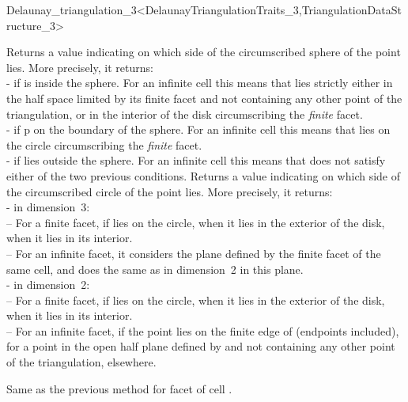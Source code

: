 \begin{ccRefClass}{Delaunay_triangulation_3<DelaunayTriangulationTraits_3,TriangulationDataStructure_3>}

{Returns a value indicating on which side of the circumscribed sphere
of  the point  lies. More precisely, it returns:\\
-  if  is inside the sphere. For an infinite
cell this means that  lies strictly either in the half space
limited by its finite facet and not containing any other point of the
triangulation, or in the interior of the disk circumscribing the
\textit{finite} facet. \\ 
-  if p on the boundary of the sphere. For an infinite
cell this means that  lies on the circle circumscribing
the \textit{finite} facet.\\ 
-  if  lies outside the sphere. For an
infinite cell this means that  does not satisfy either of the
two previous conditions. 
}
{Returns a value indicating on which side of the circumscribed circle
of  the point  lies. More precisely, it returns:\\
- in dimension~3:\\
-- For a finite facet,  if  lies
on the circle,  when it lies in the exterior of
the disk,  when it lies in its interior.\\
-- For an infinite facet, it considers the plane defined by the finite
facet of the same cell, and does the same as in dimension~2 in this
plane.\\
- in dimension~2:\\
-- For a finite facet,  if  lies
on the circle,  when it lies in the exterior of
the disk,  when it lies in its interior.\\
-- For an infinite facet,  if the
point lies on the finite edge of  (endpoints included),
 for a point in the open half plane defined
by  and not containing any other point of the triangulation,
 elsewhere. 
}

{Same as the previous method for facet  of cell .}


\end{ccRefClass}
